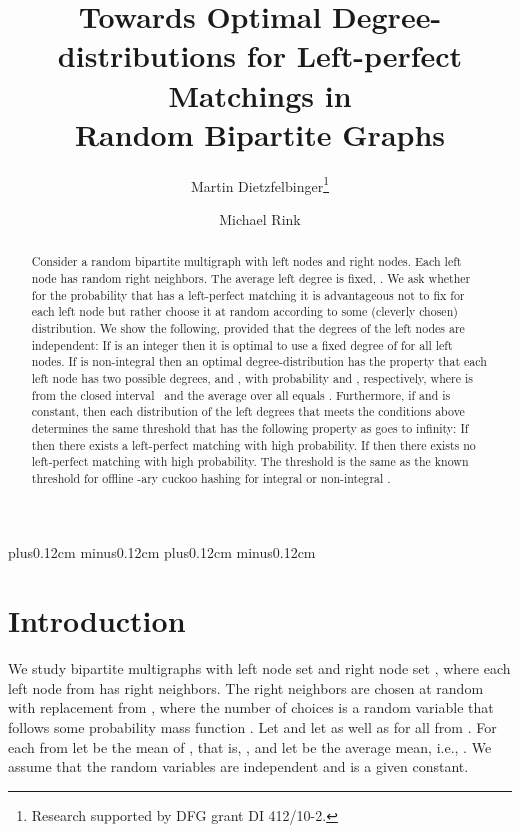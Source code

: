 \let\accentvec\vec \documentclass{llncs}
\begin{document}
  plus0.12cm minus0.12cm
  plus0.12cm minus0.12cm

\title{Towards Optimal Degree-distributions for Left-perfect Matchings in\texorpdfstring{\\}{}Random Bipartite Graphs}
\author{Martin Dietzfelbinger\thanks{Research supported by DFG grant DI 412/10-2.} \and Michael Rink}


\maketitle
\begin{abstract}
\vspace{-0.4cm}
Consider a random bipartite multigraph  with  left nodes and 
right nodes. Each left node  has  random right neighbors.
The average left degree  is fixed, .
We ask whether for the probability that  has a left-perfect matching
it is advantageous not to fix  for each left node  but rather choose it
at random according to some (cleverly chosen) distribution. We show the following,
provided that the degrees of the left nodes are independent: 
If  is an integer then it is optimal to use a fixed degree of  for all left nodes.
If  is non-integral then an optimal degree-distribution has the property that
each left node  has two possible degrees,  and ,
with probability  and , respectively, where  is from the closed interval~
and the average over all  equals .
Furthermore, if  and  is constant,
then each distribution of the left degrees that meets the conditions above determines the same
threshold  that has the following property as  goes to infinity:
If  then there exists a left-perfect matching with high probability.
If  then there exists no left-perfect matching with high probability.
The threshold  is the same as the known threshold for offline -ary cuckoo hashing
for integral or non-integral .
\vspace{-0.1cm}
\end{abstract}

\section{Introduction}
We study bipartite multigraphs  with left node set  and right node set ,
where each left node  from  has  right neighbors.
The right neighbors are chosen at random with replacement from ,
where the number of choices  is a random variable that follows some probability mass function .
Let  and let  as well as  for all  from .
For each  from  let  be the mean of , that is, ,
and let  be the average mean, i.e., .
We assume that the random variables  are independent and  is a given constant. 
\end{document}
